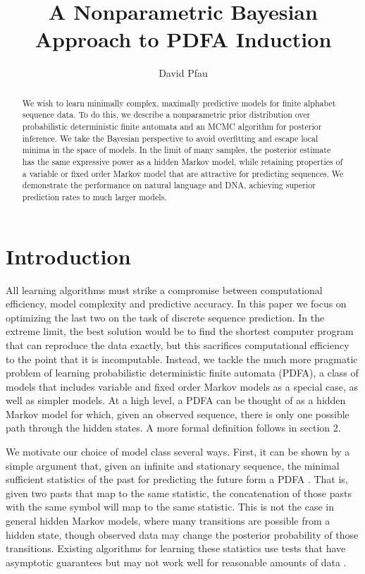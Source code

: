 \documentclass[11pt]{article}
\title{A Nonparametric Bayesian Approach to PDFA Induction}
\author{David Pfau}
\begin{document}
\maketitle

\begin{abstract}
We wish to learn minimally complex, maximally predictive models for finite alphabet sequence data.  To do this, we describe a nonparametric prior distribution over probabilistic deterministic finite automata and an MCMC algorithm for posterior inference.  We take the Bayesian perspective to avoid overfitting and escape local minima in the space of models.  In the limit of many samples, the posterior estimate has the same expressive power as a hidden Markov model, while retaining properties of a variable or fixed order Markov model that are attractive for predicting sequences.  We demonstrate the performance on natural language and DNA, achieving superior prediction rates to much larger models.
\end{abstract}

\section{Introduction}
All learning algorithms must strike a compromise between computational efficiency, model complexity and predictive accuracy.  In this paper we focus on optimizing the last two on the task of discrete sequence prediction.  In the extreme limit, the best solution would be to find the shortest computer program that can reproduce the data exactly, but this sacrifices computational efficiency to the point that it is incomputable.  Instead, we tackle the much more pragmatic problem of learning probabilistic deterministic finite automata (PDFA), a class of models that includes variable and fixed order Markov models as a special case, as well as simpler models.  At a high level, a PDFA can be thought of as a hidden Markov model for which, given an observed sequence, there is only one possible path through the hidden states.  A more formal definition follows in section 2.

We motivate our choice of model class several ways.  First, it can be shown by a simple argument that, given an infinite and stationary sequence, the minimal sufficient statistics of the past for predicting the future form a PDFA \cite{Crutchfield1999}.  That is, given two pasts that map to the same statistic, the concatenation of those pasts with the same symbol will map to the same statistic.  This is not the case in general hidden Markov models, where many transitions are possible from a hidden state, though observed data may change the posterior probability of those transitions.  Existing algorithms for learning these statistics use tests that have asymptotic guarantees but may not work well for reasonable amounts of data \cite{Shalizi2004}.
\end{document}
